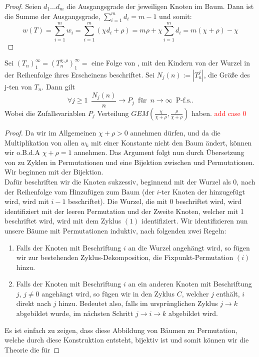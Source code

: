 \begin{proof}
    Seien $d_1...d_m$ die Ausgangsgrade der jeweiligen Knoten im Baum. Dann ist die Summe der Ausgangsgrade, $\sum_{i=1}^{m}d_i = m-1$ und somit:
    \[
     w(T) = \sum_{i=1}^{m}w_i = \sum_{i=1}^{m} (\chi d_i + \rho) = m \rho + \chi \sum_{i = 1}^{m} d_i = m(\chi + \rho) - \chi  
    \]
\end{proof}
\begin{theorem} \cite[Theorem 3.2]{janson2019random}
    Sei $(T_n)_1^\infty =(T_n^{\chi,\rho})_1^\infty = $ eine Folge von \linpreft, mit den Kindern von der Wurzel in der Reihenfolge ihres Erscheinens beschriftet. Sei $N_j(n) := |T^j_n|$, die Größe des j-ten \PsubT von $T_n$. Dann gilt 
    \[ 
        \forall j \geq 1  \hspace{6pt} \frac{N_j(n)}{n}  \rightarrow P_j \hspace{6pt} \text{für} \hspace{6pt} n \rightarrow \infty \hspace{6pt} \text{P-f.s.}.
  \]
Wobei die Zufallsvariablen  $P_j$ Verteilung $GEM(\frac{\chi}{\chi+\rho},{\frac{\rho}{\chi+\rho}})$ haben. \textcolor{red}{add case 0} 
\end{theorem}
\begin{proof}
    Da wir im Allgemeinen $\chi + \rho > 0 $ annehmen dürfen, und da die Multiplikation von allen $w_k$ mit einer Konstante nicht den Baum ändert, können wir o.B.d.A   $\chi + \rho = 1 $ annehmen. Das Argument folgt nun durch Übersetzung von \PsubT zu Zyklen in Permutationen und eine Bijektion zwischen \linpreft und Permutationen. Wir beginnen mit der Bijektion. \\
    Dafür beschriften wir die Knoten sukzessiv, beginnend mit der Wurzel als 0, nach der Reihenfolge vom Hinzufügen zum Baum (der $i$-ter Knoten der hinzugefügt wird, wird mit $i-1$ beschriftet). Die Wurzel, die mit 0 beschriftet wird, wird identifiziert mit der leeren Permutation und der Zweite Knoten, welcher mit 1 beschriftet wird, wird mit dem Zyklus $(1)$ identifiziert. Wir identifizieren nun unsere Bäume mit Permutationen induktiv, nach folgenden zwei Regeln:
    \begin{enumerate}
        \item Falls der Knoten mit Beschriftung $i$ an die Wurzel angehängt wird, so fügen wir zur bestehenden Zyklus-Dekomposition, die Fixpunkt-Permutation $(i)$ hinzu.
        \item Falls der Knoten mit Beschriftung $i$ an ein anderen Knoten mit Beschriftung $j$, $j \neq 0$ angehängt wird, so fügen wir in den Zyklus $C$, welcher $j$ enthält, $i$ direkt nach $j$ hinzu. Bedeutet also, falls im ursprünglichen Zyklus $j \rightarrow k$ abgebildet wurde, im nächsten Schritt $j \rightarrow i \rightarrow k$ abgebildet wird.
    \end{enumerate}
Es ist einfach zu zeigen, dass diese Abbildung von Bäumen zu Permutation, welche durch diese Konstruktion entsteht, bijektiv ist und somit können wir die Theorie die für 
\end{proof}

